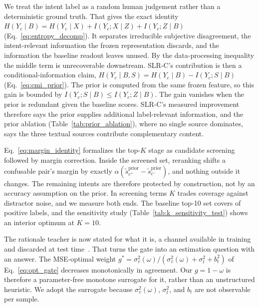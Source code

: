 {

 We treat the intent label as a random human judgement rather than a deterministic ground truth. That gives the exact identity $H(Y_c\mid B)=H(Y_c\mid X)+I(Y_c;X\mid Z)+I(Y_c;Z\mid B)$ (Eq.~\eqref{eq:entropy_decomp}). It separates irreducible subjective disagreement, the intent-relevant information the frozen representation discards, and the information the baseline readout leaves unused. By the data-processing inequality the middle term is unrecoverable downstream. SLR-C's contribution is then a conditional-information claim, $H(Y_c\mid B,S)=H(Y_c\mid B)-I(Y_c;S\mid B)$ (Eq.~\eqref{eq:cmi_prior}). The prior is computed from the same frozen feature, so this gain is bounded by $I(Y_c;S\mid B)\le I(Y_c;Z\mid B)$. The gain vanishes when the prior is redundant given the baseline scores. SLR-C's measured improvement therefore says the prior supplies additional label-relevant information, and the prior ablation (Table~\ref{tab:prior_ablation}), where no single source dominates, says the three textual sources contribute complementary content.

 Eq.~\eqref{eq:margin_identity} formalizes the top-$K$ stage as candidate screening followed by margin correction. Inside the screened set, reranking shifts a confusable pair's margin by exactly $\alpha(\tilde{s}^{\mathrm{prior}}_{c^+}-\tilde{s}^{\mathrm{prior}}_{c^-})$, and nothing outside it changes. The remaining intents are therefore protected by construction, not by an accuracy assumption on the prior. In screening terms $K$ trades coverage against distractor noise, and we measure both ends. The baseline top-10 set covers  of positive labels, and the sensitivity study (Table~\ref{tab:k_sensitivity_test}) shows an interior optimum at $K=10$.

 The rationale teacher is now stated for what it is, a channel available in training and discarded at test time~\cite{vapnik_new_2009,lopez-paz_unifying_2016}. That turns the gate into an estimation question with an answer. The MSE-optimal weight $g^{\ast}=\sigma_v^2(\omega)/(\sigma_v^2(\omega)+\sigma_t^2+b_t^2)$ of Eq.~\eqref{eq:opt_gate} decreases monotonically in agreement. Our $g=1-\omega$ is therefore a parameter-free monotone surrogate for it, rather than an unstructured heuristic. We adopt the surrogate because $\sigma_v^2(\omega)$, $\sigma_t^2$, and $b_t$ are not observable per sample.

}
